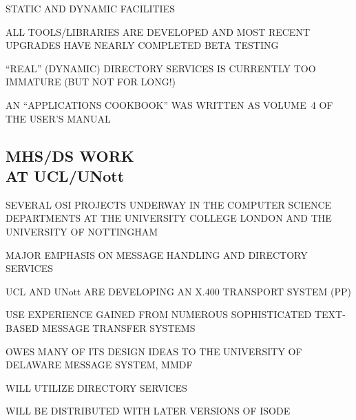 

\begin{bwslide}

\begin{nrtc}
\item	STATIC AND DYNAMIC FACILITIES
    \begin{nrtc}
    \item	ALL TOOLS/LIBRARIES ARE DEVELOPED AND MOST RECENT UPGRADES
		HAVE NEARLY COMPLETED BETA TESTING

    \item	``REAL'' (DYNAMIC) DIRECTORY SERVICES IS CURRENTLY TOO
		IMMATURE (BUT NOT FOR LONG!)
    \end{nrtc}

\item	AN ``APPLICATIONS COOKBOOK'' WAS WRITTEN AS VOLUME~4 OF THE USER'S
	MANUAL
\end{nrtc}
\end{bwslide}


\begin{bwslide}
\part*	{MHS/DS WORK\\ AT UCL/UNott}\bf

\begin{nrtc}
\item	SEVERAL OSI PROJECTS UNDERWAY IN THE COMPUTER SCIENCE DEPARTMENTS
	AT THE UNIVERSITY COLLEGE LONDON AND THE UNIVERSITY OF NOTTINGHAM

\item	MAJOR EMPHASIS ON MESSAGE HANDLING AND DIRECTORY SERVICES
\end{nrtc}
\end{bwslide}


\begin{bwslide}

\begin{nrtc}
\item	UCL AND UNott ARE DEVELOPING AN X.400 TRANSPORT SYSTEM (PP)

\item	USE EXPERIENCE GAINED FROM NUMEROUS SOPHISTICATED TEXT-BASED MESSAGE
	TRANSFER SYSTEMS

\item	OWES MANY OF ITS DESIGN IDEAS TO THE UNIVERSITY OF DELAWARE MESSAGE
	SYSTEM, MMDF

\item	WILL UTILIZE DIRECTORY SERVICES

\item	WILL BE DISTRIBUTED WITH LATER VERSIONS OF ISODE
\end{nrtc}
\end{bwslide}


